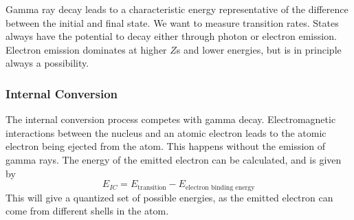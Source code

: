 \noindent Gamma ray decay leads to a characteristic energy representative of the difference
between the initial and final state. We want to measure transition rates.
States always have the potential to decay either through photon or electron emission.
Electron emission dominates at higher $Z$s and lower energies, but is in principle
always a possibility. 

\subsubsection{Internal Conversion}
The internal conversion process competes with gamma decay. Electromagnetic interactions
between the nucleus and an atomic electron leads to the atomic electron being ejected
from the atom. This happens without the emission of gamma rays. The energy of the
emitted electron can be calculated, and is given by
\begin{equation}
	E_{IC} = E_{\text{transition}} - E_{\text{electron binding energy}}
\end{equation}
This will give a quantized set of possible energies, as the emitted electron can come 
from different shells in the atom.

